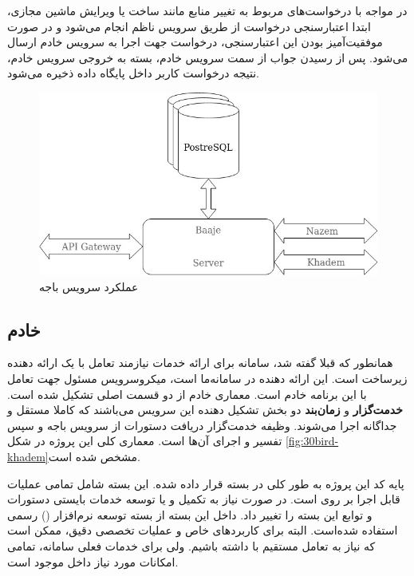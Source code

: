 در مواجه با درخواست‌های مربوط به تغییر منابع مانند ساخت یا ویرایش ماشین مجازی، ابتدا اعتبارسنجی درخواست از طریق سرویس ناظم انجام می‌شود و در صورت موفقیت‌آمیز بودن این اعتبارسنجی، درخواست جهت اجرا به سرویس خادم ارسال می‌شود. پس از رسیدن جواب از سمت سرویس خادم، بسته به خروجی سرویس خادم، نتیجه درخواست کاربر داخل پایگاه داده ذخیره می‌شود.
\begin{figure}
	\centering
	\includegraphics[scale=0.5]{figures/30bird-baaje.jpg}
	\caption{عملکرد سرویس باجه}
	\label{fig:30bird-baaje}
\end{figure}


\subsection{خادم}
همانطور که قبلا گفته شد، سامانه برای ارائه خدمات  نیازمند تعامل با یک ارائه دهنده زیرساخت است. این ارائه دهنده در سامانه‌ما  است، میکروسرویس مسئول جهت تعامل با این برنامه خادم است. معماری خادم از دو قسمت اصلی تشکیل شده است. \textbf{خدمت‌گزار} و \textbf{زمان‌بند} دو بخش تشکیل دهنده این سرویس می‌باشند که کاملا مستقل و جداگانه اجرا می‌شوند. وظیفه خدمت‌گزار دریافت دستورات از سرویس باجه و سپس تفسیر و اجرای آن‌‌ها است. معماری کلی این پروژه در شکل \ref{fig:30bird-khadem}مشخص شده است.

پایه کد این پروژه به طور کلی در بسته  قرار داده شده. این بسته شامل تمامی عملیات قابل اجرا بر روی  است. در صورت نیاز به تکمیل و یا توسعه خدمات بایستی دستورات و توابع این بسته را تغییر داد. داخل این بسته از بسته توسعه نرم‌افزار () رسمی  استفاده شده‌است. البته برای کاربرد‌های خاص و عملیات تخصصی دقیق، ممکن است که نیاز به تعامل مستقیم با  داشته باشیم. ولی برای خدمات فعلی سامانه، تمامی امکانات مورد نیاز داخل  موجود است.

